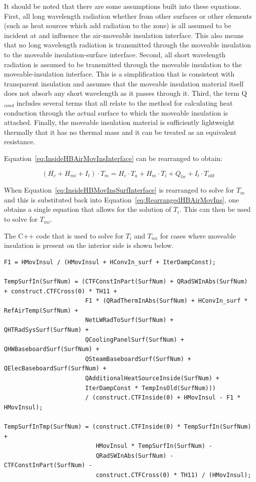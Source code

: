 It should be noted that there are some assumptions built into these equations.  First, all long wavelength radiation whether from other surfaces or other elements (such as heat sources which add radiation to the zone) is all assumed to be incident at and influence the air-moveable insulation interface.  This also means that no long wavelength radiation is transmitted through the moveable insulation to the moveable insulation-surface interface.  Second, all short wavelength radiation is assumed to be transmitted through the moveable insulation to the moveable-insulation interface.  This is a simplification that is consistent with transparent insulation and assumes that the moveable insulation material itself does not absorb any short wavelength as it passes through it.  Third, the term Q\(_{cond}\) includes several terms that all relate to the method for calculating heat conduction through the actual surface to which the moveable insulation is attached.  Finally, the moveable insulation material is sufficiently lightweight thermally that it has no thermal mass and it can be treated as an equivalent resistance.

Equation~\ref{eq:InsideHBAirMovInsInterface} can be rearranged to obtain:

\begin{equation}
\left( H_c + H_{mi} + I_t \right) \cdot T_m = H_c \cdot T_a + H_m \cdot T_i + Q_{lw} + I_t \cdot T_{old}
\label{eq:RearrangedHBAirMovIns}
\end{equation}

When Equation~\ref{eq:InsideHBMovInsSurfInterface} is rearranged to solve for \(T_m\) and this is substituted back into Equation~\ref{eq:RearrangedHBAirMovIns}, one obtains a single equation that allows for the solution of \(T_i\).  This can then be used to solve for \(T_{mi}\).

The C++ code that is used to solve for \(T_i\) and \(T_{mi}\) for cases where moveable insulation is present on the interior side is shown below.

\begin{lstlisting}
F1 = HMovInsul / (HMovInsul + HConvIn_surf + IterDampConst);

TempSurfIn(SurfNum) = (CTFConstInPart(SurfNum) + QRadSWInAbs(SurfNum) + construct.CTFCross(0) * TH11 +
                       F1 * (QRadThermInAbs(SurfNum) + HConvIn_surf * RefAirTemp(SurfNum) +
                       NetLWRadToSurf(SurfNum) + QHTRadSysSurf(SurfNum) +
                       QCoolingPanelSurf(SurfNum) + QHWBaseboardSurf(SurfNum) +
                       QSteamBaseboardSurf(SurfNum) + QElecBaseboardSurf(SurfNum) +
                       QAdditionalHeatSourceInside(SurfNum) +
                       IterDampConst * TempInsOld(SurfNum)))
                       / (construct.CTFInside(0) + HMovInsul - F1 * HMovInsul); 

TempSurfInTmp(SurfNum) = (construct.CTFInside(0) * TempSurfIn(SurfNum) + 
                          HMovInsul * TempSurfIn(SurfNum) -
                          QRadSWInAbs(SurfNum) - CTFConstInPart(SurfNum) -
                          construct.CTFCross(0) * TH11) / (HMovInsul);
\end{lstlisting}

